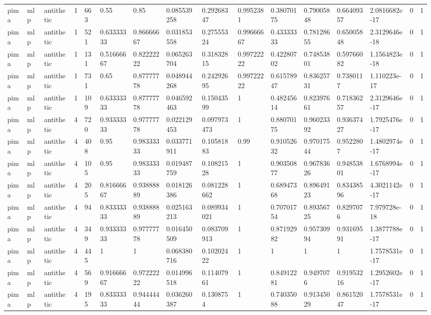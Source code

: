 \begin{tabular}{llllllllllllllll}
pima & mlp & antithetic & 1 & 663 & 0.55 & 0.85 & 0.085539258 & 0.29268347 & 0.9952381 & 0.38070175 & 0.79005848 & 0.66409357 & 2.0816682e-17 & 0 & 1 \\
pima & mlp & antithetic & 1 & 521 & 0.63333333 & 0.86666667 & 0.031853558 & 0.27555324 & 0.99666667 & 0.43333333 & 0.78128655 & 0.65005848 & 2.3129646e-18 & 0 & 1 \\
pima & mlp & antithetic & 1 & 131 & 0.51666667 & 0.82222222 & 0.065263704 & 0.31832815 & 0.99722222 & 0.42280702 & 0.74853801 & 0.59766082 & 1.1564823e-18 & 0 & 1 \\
pima & mlp & antithetic & 1 & 731 & 0.65 & 0.87777778 & 0.048944268 & 0.24292695 & 0.99722222 & 0.61578947 & 0.83625731 & 0.7380117 & 1.110223e-17 & 0 & 1 \\
pima & mlp & antithetic & 1 & 109 & 0.63333333 & 0.87777778 & 0.046592463 & 0.15043599 & 1 & 0.48245614 & 0.82397661 & 0.71836257 & 2.3129646e-17 & 0 & 1 \\
pima & mlp & antithetic & 4 & 720 & 0.93333333 & 0.97777778 & 0.022129453 & 0.097973473 & 1 & 0.88070175 & 0.96023392 & 0.93637427 & 1.7925476e-17 & 0 & 1 \\
pima & mlp & antithetic & 4 & 408 & 0.95 & 0.98333333 & 0.033771911 & 0.10581883 & 0.99 & 0.91052632 & 0.97017544 & 0.9522807 & 1.4802974e-17 & 0 & 1 \\
pima & mlp & antithetic & 4 & 105 & 0.95 & 0.98333333 & 0.019487759 & 0.10821528 & 1 & 0.90350877 & 0.96783626 & 0.94853801 & 1.6768994e-17 & 0 & 1 \\
pima & mlp & antithetic & 4 & 205 & 0.81666667 & 0.93888889 & 0.018126386 & 0.081228662 & 1 & 0.68947368 & 0.89649123 & 0.83438596 & 4.3021142e-17 & 0 & 1 \\
pima & mlp & antithetic & 4 & 94 & 0.83333333 & 0.93888889 & 0.025163213 & 0.089934021 & 1 & 0.70701754 & 0.89356725 & 0.8297076 & 7.979728e-18 & 0 & 1 \\
pima & mlp & antithetic & 4 & 349 & 0.93333333 & 0.97777778 & 0.016450509 & 0.083709913 & 1 & 0.87192982 & 0.95730994 & 0.93169591 & 1.3877788e-17 & 0 & 1 \\
pima & mlp & antithetic & 4 & 445 & 1 & 1 & 0.068380716 & 0.10202422 & 1 & 1 & 1 & 1 & 1.7578531e-17 & 0 & 1 \\
pima & mlp & antithetic & 4 & 569 & 0.91666667 & 0.97222222 & 0.014996518 & 0.11407961 & 1 & 0.84912281 & 0.9497076 & 0.91953216 & 1.2952602e-17 & 0 & 1 \\
pima & mlp & antithetic & 4 & 195 & 0.83333333 & 0.94444444 & 0.036260387 & 0.1308754 & 1 & 0.74035088 & 0.91345029 & 0.86152047 & 1.7578531e-17 & 0 & 1 \\

\end{tabular}
